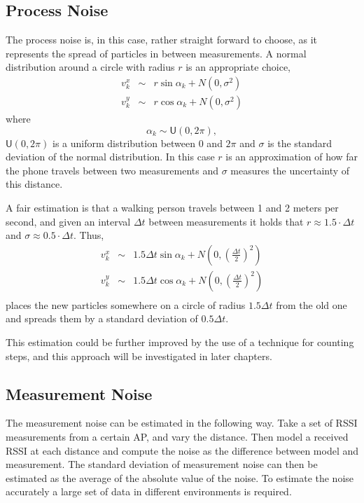 \documentclass{LTHthesis}
\begin{document}
\subsection{Process Noise}  
%
The process noise is, in this case, rather straight forward to choose, as it represents the spread of particles in between measurements. A normal distribution around a circle with radius $r$ is an appropriate choice,
%
\begin{eqnarray}
v^x_k &\sim &r\sin{\alpha_k}+N(0,\sigma^2)\\
v^y_k &\sim &r\cos{\alpha_k}+N(0,\sigma^2)
\end{eqnarray}
%
where
%
\begin{equation}
\alpha_k \sim \mathsf U(0,2\pi),
\end{equation}
%
$\mathsf{U}(0,2\pi)$ is a uniform distribution between $0$ and $2\pi$ and $\sigma$ is the standard deviation of the normal distribution. In this case $r$ is an approximation of how far the phone travels between two measurements and $\sigma$ measures the uncertainty of this distance. 

A fair estimation is that a walking person travels between 1 and 2 meters per second, and given an interval $\Delta t$ between measurements it holds that $r \approx 1.5\cdot\Delta t$ and $\sigma \approx 0.5\cdot\Delta t$. Thus,
%
\begin{eqnarray}
v^x_k&\sim &1.5\Delta t \sin{\alpha_k} + N \left(0, \left(\frac{\Delta t}{2}\right)^2\right)\\
v^y_k&\sim &1.5\Delta t \cos{\alpha_k} + N \left(0, \left(\frac{\Delta t}{2}\right)^2\right)\\
\end{eqnarray}
places the new particles somewhere on a circle of radius $1.5\Delta t$ from the old one and spreads them by a standard deviation of $0.5\Delta t$.

This estimation could be further improved by the use of a technique for counting steps, and this approach will be investigated in later chapters.    
%
\subsection{Measurement Noise}
%
The measurement noise can be estimated in the following way. Take a set of RSSI measurements from a certain AP, and vary the distance. Then model a received RSSI at each distance and compute the noise as the difference between model and measurement. The standard deviation of measurement noise can then be estimated as the average of the absolute value of the noise. To estimate the noise accurately a large set of data in different environments is required.
\end{document}

